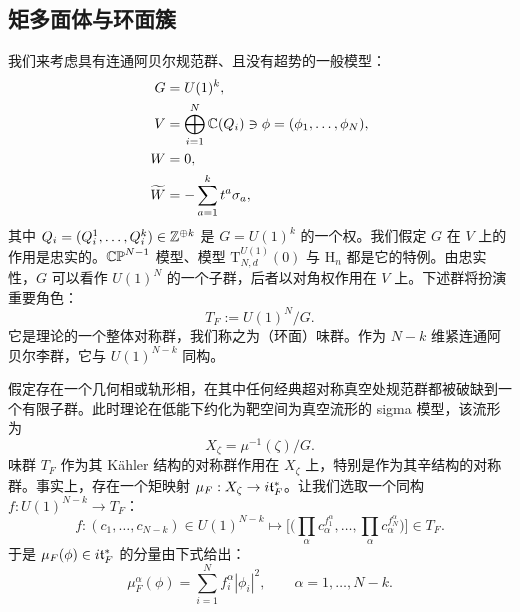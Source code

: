 \subsection{矩多面体与环面簇}
我们来考虑具有连通阿贝尔规范群、且没有超势的一般模型：
\begin{align*}
    G &= U(1)^k,\\
    V &= \bigoplus_{i=1}^{N}\mathbb{C}(Q_i)\ni\phi=(\phi_1,\ldots,\phi_N),\\
    W &= 0,\\
    \widetilde{W} &= -\sum_{a=1}^{k}t^a\sigma_a,
\end{align*}
其中 $Q_i=(Q_i^1,\ldots,Q_i^k)\in\mathbb{Z}^{\oplus k}$ 是 $G=U(1)^k$ 的一个权。我们假定 $G$ 在 $V$ 上的作用是忠实的。$\mathbb{CP}^{N-1}$ 模型、模型 $\mathrm{T}^{U(1)}_{N,d}(0)$ 与 $\mathrm{H}_n$ 都是它的特例。由忠实性，$G$ 可以看作 $U(1)^N$ 的一个子群，后者以对角权作用在 $V$ 上。下述群将扮演重要角色：
\begin{equation}
    T_F:=U(1)^N/G. \tag{4.39}
\end{equation}
它是理论的一个整体对称群，我们称之为（环面）味群。作为 $N-k$ 维紧连通阿贝尔李群，它与 $U(1)^{N-k}$ 同构。

假定存在一个几何相或轨形相，在其中任何经典超对称真空处规范群都被破缺到一个有限子群。此时理论在低能下约化为靶空间为真空流形的 sigma 模型，该流形为
\begin{equation}
    X_\zeta=\mu^{-1}(\zeta)/G. \tag{4.40}
\end{equation}
味群 $T_F$ 作为其 Kähler 结构的对称群作用在 $X_\zeta$ 上，特别是作为其辛结构的对称群。事实上，存在一个矩映射 $\mu_F:X_\zeta\to i\mathfrak{t}_F^*$。让我们选取一个同构 $f:U(1)^{N-k}\to T_F$：
\begin{equation}
    f:(c_1,\ldots,c_{N-k})\in U(1)^{N-k}\longmapsto
    \Big[\Big(\prod_\alpha c_\alpha^{f_1^\alpha},\ldots,\prod_\alpha c_\alpha^{f_N^\alpha}\Big)\Big]\in T_F. \tag{4.41}
\end{equation}
于是 $\mu_F(\phi)\in i\mathfrak{t}_F^*$ 的分量由下式给出：
\begin{equation}
    \mu_F^\alpha(\phi)=\sum_{i=1}^{N}f_i^\alpha|\phi_i|^2,\qquad
    \alpha=1,\ldots,N-k. \tag{4.42}
\end{equation}
